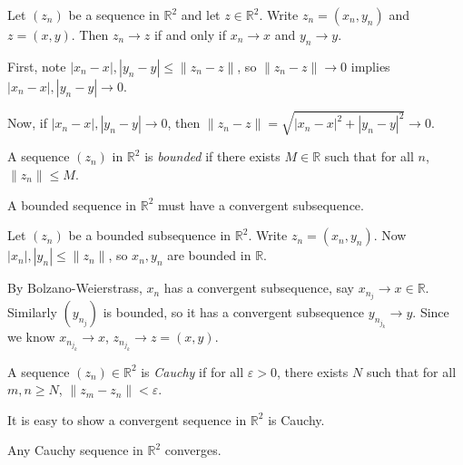 \documentclass[12pt]{article}
\begin{document}
\begin{proposition}
	Let $(z_n)$ be a sequence in $\mathbb{R}^2$ and let $z \in \mathbb{R}^2$. Write $z_n = (x_n, y_n)$ and $z = (x, y)$. Then $z_n \to z$ if and only if $x_n \to x$ and $y_n \to y$.
\end{proposition}

\begin{proofbox}
First, note $|x_n - x|, |y_n - y| \leq \|z_n - z\|$, so $\|z_n - z\| \to 0$ implies $|x_n - x|, |y_n - y| \to 0$.

Now, if $|x_n - x|, |y_n - y| \to 0$, then $\|z_n - z\| = \sqrt{|x_n - x|^2 + |y_n - y|^2} \to 0$.
\end{proofbox}

\begin{definition}
	A sequence $(z_n)$ in $\mathbb{R}^2$ is \textit{bounded} if there exists $M \in \mathbb{R}$ such that for all $n$, $\|z_n\| \leq M$.
\end{definition}

\begin{theorem}
\item
	A bounded sequence in $\mathbb{R}^2$ must have a convergent subsequence.
\end{theorem}

\begin{proofbox}
	Let $(z_n)$ be a bounded subsequence in $\mathbb{R}^2$. Write $z_n = (x_n, y_n)$. Now $|x_n|, |y_n| \leq \|z_n\|$, so $x_n, y_n$ are bounded in $\mathbb{R}$.

	By Bolzano-Weierstrass, $x_n$ has a convergent subsequence, say $x_{n_j} \to x \in \mathbb{R}$. Similarly $(y_{n_j})$ is bounded, so it has a convergent subsequence $y_{n_{j_k}} \to y$. Since we know $x_{n_{j_k}} \to x$, $z_{n_{j_k}} \to z = (x, y)$.
\end{proofbox}

\begin{definition}
	A sequence $(z_n) \in \mathbb{R}^2$ is \textit{Cauchy} if for all $\varepsilon > 0$, there exists $N$ such that for all $m, n \geq N$, $\|z_m - z_n\| < \varepsilon$.
\end{definition}

It is easy to show a convergent sequence in $\mathbb{R}^2$ is Cauchy.

\begin{theorem}
\item
	Any Cauchy sequence in $\mathbb{R}^2$ converges.
\end{theorem}
\end{document}

